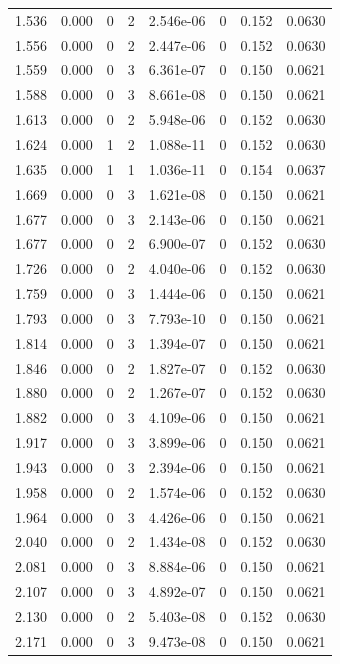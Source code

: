 \documentclass[preview]{standalone}
\begin{document}
{{{\begin{tabular}{L{1.2cm}C{1.2cm} C{0.3cm}C{0.5cm} C{1.4cm}C{1.4cm} C{1.4cm}C{1.4cm}}
  1.536  &  0.000  & 0     &  2 &  2.546e-06  & 0  & 0.152 &  0.0630   \\ 
  1.556  &  0.000  & 0     &  2 &  2.447e-06  & 0  & 0.152 &  0.0630   \\ 
  1.559  &  0.000  & 0     &  3 &  6.361e-07  & 0  & 0.150 &  0.0621   \\ 
  1.588  &  0.000  & 0     &  3 &  8.661e-08  & 0  & 0.150 &  0.0621   \\ 
  1.613  &  0.000  & 0     &  2 &  5.948e-06  & 0  & 0.152 &  0.0630   \\ 
  1.624  &  0.000  & 1     &  2 &  1.088e-11  & 0  & 0.152 &  0.0630   \\ 
  1.635  &  0.000  & 1     &  1 &  1.036e-11  & 0  & 0.154 &  0.0637   \\ 
  1.669  &  0.000  & 0     &  3 &  1.621e-08  & 0  & 0.150 &  0.0621   \\ 
  1.677  &  0.000  & 0     &  3 &  2.143e-06  & 0  & 0.150 &  0.0621   \\ 
  1.677  &  0.000  & 0     &  2 &  6.900e-07  & 0  & 0.152 &  0.0630   \\ 
  1.726  &  0.000  & 0     &  2 &  4.040e-06  & 0  & 0.152 &  0.0630   \\ 
  1.759  &  0.000  & 0     &  3 &  1.444e-06  & 0  & 0.150 &  0.0621   \\ 
  1.793  &  0.000  & 0     &  3 &  7.793e-10  & 0  & 0.150 &  0.0621   \\ 
  1.814  &  0.000  & 0     &  3 &  1.394e-07  & 0  & 0.150 &  0.0621   \\ 
  1.846  &  0.000  & 0     &  2 &  1.827e-07  & 0  & 0.152 &  0.0630   \\ 
  1.880  &  0.000  & 0     &  2 &  1.267e-07  & 0  & 0.152 &  0.0630   \\ 
  1.882  &  0.000  & 0     &  3 &  4.109e-06  & 0  & 0.150 &  0.0621   \\ 
  1.917  &  0.000  & 0     &  3 &  3.899e-06  & 0  & 0.150 &  0.0621   \\ 
  1.943  &  0.000  & 0     &  3 &  2.394e-06  & 0  & 0.150 &  0.0621   \\ 
  1.958  &  0.000  & 0     &  2 &  1.574e-06  & 0  & 0.152 &  0.0630   \\ 
  1.964  &  0.000  & 0     &  3 &  4.426e-06  & 0  & 0.150 &  0.0621   \\ 
  2.040  &  0.000  & 0     &  2 &  1.434e-08  & 0  & 0.152 &  0.0630   \\ 
  2.081  &  0.000  & 0     &  3 &  8.884e-06  & 0  & 0.150 &  0.0621   \\ 
  2.107  &  0.000  & 0     &  3 &  4.892e-07  & 0  & 0.150 &  0.0621   \\ 
  2.130  &  0.000  & 0     &  2 &  5.403e-08  & 0  & 0.152 &  0.0630   \\ 
  2.171  &  0.000  & 0     &  3 &  9.473e-08  & 0  & 0.150 &  0.0621   \\ 
\hline 
\end{tabular} 

}}}
\end{document}
